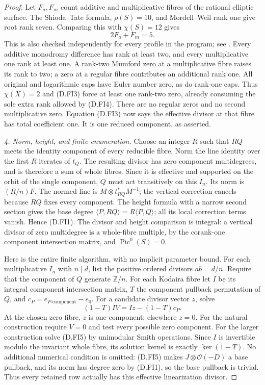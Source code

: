 \begin{proof}
Let $F_a,F_m$ count additive and multiplicative fibres of the
rational elliptic surface. The Shioda--Tate formula, $\rho(S)=10$,
and Mordell--Weil rank one give root rank seven. Comparing this
with $\chi(S)=12$ gives
\[
                            2F_a+F_m=5.
\]
This is also checked independently for every profile in the program;
see \cite[Theorem 6.3 and Corollary 6.13]{manSS10}.
Every additive monodromy difference has rank at least two, and
every multiplicative one rank at least one. A rank-two Mumford
zero at a multiplicative fibre raises its rank to two; a zero at
a regular fibre contributes an additional rank one. All original
and logarithmic caps have Euler number zero, as do rank-one caps.
Thus $\chi(X)=2$ and (D.FI3) force at least one rank-two zero,
already consuming the sole extra rank allowed by (D.FI4).
There are no regular zeros and no second multiplicative zero.
Equation (D.FI3) now says the effective divisor at that fibre has
total coefficient one. It is one reduced component, as asserted.

\emph{4. Norm, height, and finite enumeration.}
Choose an integer $R$ such that $RQ$ meets the identity component
of every reducible fibre. Norm the line identity over the first
$R$ iterates of $t_Q$. The resulting divisor has zero component
multidegrees, and is therefore a sum of whole fibres. Since it is
effective and supported on the orbit of the single component,
$Q$ must act transitively on this $I_n$. Its norm is $(R/n)F$.
The normed line is
$M\otimes t_{RQ}^*M^{-1}$; the vertical correction cancels because
$RQ$ fixes every component. The height formula with a narrow second
section gives the base degree
$\langle P,RQ\rangle=R\langle P,Q\rangle$; all its local correction
terms vanish. Hence (D.FI1). The divisor and height comparison is
integral: a vertical divisor of zero multidegree is a whole-fibre
multiple, by the corank-one component intersection matrix, and
$\operatorname{Pic}^0(S)=0$.

Here is the entire finite algorithm, with no implicit parameter
bound. For each multiplicative $I_n$ with $n\mid d$, list the
positive ordered divisors $ab=d/n$. Require that the component
of $Q$ generate $\mathbb Z/n$. For each Kodaira fibre let $I$ be
its integral component intersection matrix, $T$ the component
pullback permutation of $Q$, and $c_P=e_{P\text{-component}}-e_0$.
For a candidate divisor vector $z$, solve
\[
              (1-T)I V=Iz-(1-T)c_P.                         \tag{D.FI5}
\]
At the chosen zero fibre, $z$ is one component; elsewhere $z=0$.
For the natural construction require $V=0$ and test every possible
zero component. For the larger construction solve (D.FI5) by
unimodular Smith operations. Since $I$ is invertible modulo the
invariant whole fibre, its solution kernel is exactly $\ker(1-T)$.
No additional numerical condition is omitted: (D.FI5) makes
$J\otimes\mathcal O(-D)$ a base pullback, and its norm has degree
zero by (D.FI1), so the base pullback is trivial. Thus every retained
row actually has this effective linearization divisor.


\end{proof}
